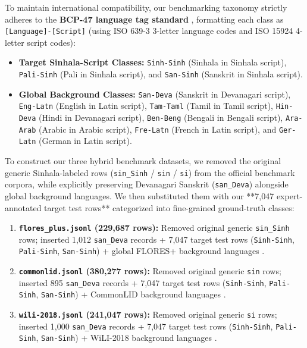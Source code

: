 \documentclass[conference]{IEEEtran}
\begin{document}
To maintain international compatibility, our benchmarking taxonomy strictly adheres to the \textbf{BCP-47 language tag standard} \cite{b18}, formatting each class as \texttt{[Language]-[Script]} (using ISO 639-3 3-letter language codes and ISO 15924 4-letter script codes):
\begin{itemize}
    \item \textbf{Target Sinhala-Script Classes:} \texttt{Sinh-Sinh} (Sinhala in Sinhala script), \texttt{Pali-Sinh} (Pali in Sinhala script), and \texttt{San-Sinh} (Sanskrit in Sinhala script).
    \item \textbf{Global Background Classes:} \texttt{San-Deva} (Sanskrit in Devanagari script), \texttt{Eng-Latn} (English in Latin script), \texttt{Tam-Taml} (Tamil in Tamil script), \texttt{Hin-Deva} (Hindi in Devanagari script), \texttt{Ben-Beng} (Bengali in Bengali script), \texttt{Ara-Arab} (Arabic in Arabic script), \texttt{Fre-Latn} (French in Latin script), and \texttt{Ger-Latn} (German in Latin script).
\end{itemize}

To construct our three hybrid benchmark datasets, we removed the original generic Sinhala-labeled rows (\texttt{sin\_Sinh} / \texttt{sin} / \texttt{si}) from the official benchmark corpora, while explicitly preserving Devanagari Sanskrit (\texttt{san\_Deva}) alongside global background languages. We then substituted them with our **7,047 expert-annotated target test rows** categorized into fine-grained ground-truth classes:
\begin{enumerate}
    \item \textbf{\texttt{flores\_plus.jsonl} (229,687 rows):} Removed original generic \texttt{sin\_Sinh} rows; inserted 1,012 \texttt{san\_Deva} records + 7,047 target test rows (\texttt{Sinh-Sinh}, \texttt{Pali-Sinh}, \texttt{San-Sinh}) + global FLORES+ background languages \cite{b15}.
    \item \textbf{\texttt{commonlid.jsonl} (380,277 rows):} Removed original generic \texttt{sin} rows; inserted 895 \texttt{san\_Deva} records + 7,047 target test rows (\texttt{Sinh-Sinh}, \texttt{Pali-Sinh}, \texttt{San-Sinh}) + CommonLID background languages \cite{b17}.
    \item \textbf{\texttt{wili-2018.jsonl} (241,047 rows):} Removed original generic \texttt{si} rows; inserted 1,000 \texttt{san\_Deva} records + 7,047 target test rows (\texttt{Sinh-Sinh}, \texttt{Pali-Sinh}, \texttt{San-Sinh}) + WiLI-2018 background languages \cite{b14}.
\end{enumerate}
\end{document}
